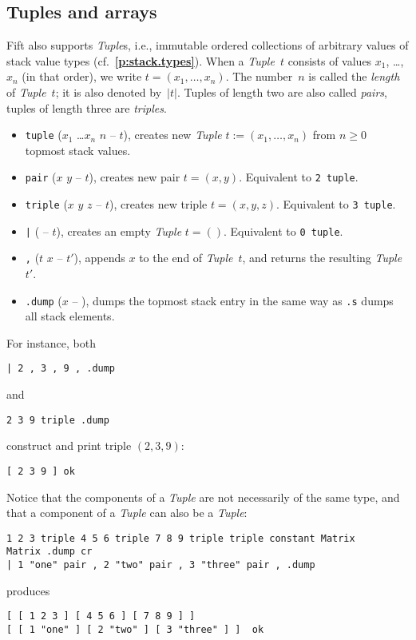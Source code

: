 \documentclass[12pt,oneside]{article}
\def\refpoint#1{{\rm\textbf{\ref{#1}}}}
\let\ptref=\refpoint
\def\mysubsection#1{\subsection{#1}\fancyhead[C]{\small{\textsc{\textrm{\thesubsection.} #1}}}}
\begin{document}
\mysubsection{Tuples and arrays}\label{p:tuples}
Fift also supports {\em Tuple\/}s, i.e., immutable ordered collections of arbitrary values of stack value types (cf.~\ptref{p:stack.types}). When a {\em Tuple\/}~$t$ consists of values $x_1$, \dots, $x_n$ (in that order), we write $t=(x_1,\ldots,x_n)$. The number~$n$ is called the {\em length\/} of {\em Tuple\/}~$t$; it is also denoted by~$|t|$. Tuples of length two are also called {\em pairs}, tuples of length three are {\em triples}.
\begin{itemize}
\item {\tt tuple} ($x_1$ \dots $x_n$ $n$ -- $t$), creates new {\em Tuple\/} $t:=(x_1,\ldots,x_n)$ from $n\geq0$ topmost stack values.
\item {\tt pair} ($x$ $y$ -- $t$), creates new pair $t=(x,y)$. Equivalent to {\tt 2 tuple}.
\item {\tt triple} ($x$ $y$ $z$ -- $t$), creates new triple $t=(x,y,z)$. Equivalent to {\tt 3 tuple}.
\item {\tt |} ( -- $t$), creates an empty {\em Tuple\/} $t=()$. Equivalent to {\tt 0 tuple}.
\item {\tt ,} ($t$ $x$ -- $t'$), appends $x$ to the end of {\em Tuple\/}~$t$, and returns the resulting {\em Tuple\/}~$t'$.
\item {\tt .dump} ($x$ -- ), dumps the topmost stack entry in the same way as {\tt .s} dumps all stack elements.
\end{itemize}
For instance, both
\begin{verbatim}
| 2 , 3 , 9 , .dump
\end{verbatim}
and
\begin{verbatim}
2 3 9 triple .dump
\end{verbatim}
construct and print triple $(2,3,9)$:
\begin{verbatim}
[ 2 3 9 ] ok
\end{verbatim}
Notice that the components of a {\em Tuple\/} are not necessarily of the same type, and that a component of a {\em Tuple\/} can also be a {\em Tuple\/}:
\begin{verbatim}
1 2 3 triple 4 5 6 triple 7 8 9 triple triple constant Matrix
Matrix .dump cr
| 1 "one" pair , 2 "two" pair , 3 "three" pair , .dump
\end{verbatim}
produces
\begin{verbatim}
[ [ 1 2 3 ] [ 4 5 6 ] [ 7 8 9 ] ]
[ [ 1 "one" ] [ 2 "two" ] [ 3 "three" ] ]  ok
\end{verbatim}
\end{document}
